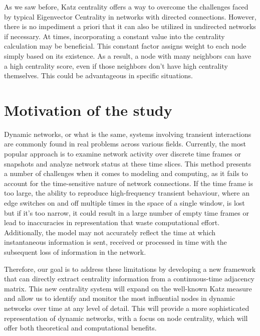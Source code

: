 As we saw before, Katz centrality offers a way to overcome the challenges faced by typical Eigenvector Centrality in networks with directed connections. However, there is no impediment a priori that it can also be utilized in undirected networks if necessary. At times, incorporating a constant value into the centrality calculation may be beneficial. This constant factor assigns weight to each node simply based on its existence. As a result, a node with many neighbors can have a high centrality score, even if those neighbors don't have high centrality themselves. This could be advantageous in specific situations.

\section{Motivation of the study}
\label{sec:motiv}
Dynamic networks, or what is the same, systems involving transient interactions are commonly found in real problems across various fields. Currently, the most popular approach is to examine network activity over discrete time frames or snapshots and analyze network status at these time slices. This method presents a number of challenges when it comes to modeling and computing, as it fails to account for the time-sensitive nature of network connections. If the time frame is too large, the ability to reproduce high-frequency transient behaviour, where an
edge switches on and off multiple times in the space of a single window, is lost but if it's too narrow, it could result in a large number of empty time frames or lead to inaccuracies in representation that waste computational
effort. Additionally, the model may not accurately reflect the time at which instantaneous information is sent, received or processed in time with the subsequent loss of information in the network.

Therefore, our goal is to address these limitations by developing a new framework that can directly extract centrality information from a continuous-time adjacency matrix. This new centrality system will expand on the well-known Katz measure and allow us to identify and monitor the most influential nodes in dynamic networks over time at any level of detail. This will provide a more sophisticated representation of dynamic networks, with a focus on node centrality, which will offer both theoretical and computational benefits.

